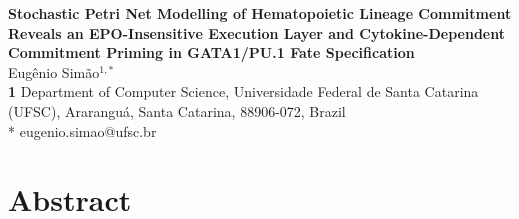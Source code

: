 \documentclass[10pt,letterpaper]{article}
\begin{document}
\vspace*{0.2in}

\begin{flushleft}
{\Large
\textbf{Stochastic Petri Net Modelling of Hematopoietic Lineage Commitment Reveals an EPO-Insensitive Execution Layer and Cytokine-Dependent Commitment Priming in GATA1/PU.1 Fate Specification}
}
\newline
\\
Eug\^enio Sim\~ao$^{1,*}$
\\
\bigskip
\textbf{1} Department of Computer Science, Universidade Federal de Santa Catarina (UFSC), Ararangu\'a, Santa Catarina, 88906-072, Brazil
\\
\bigskip
* eugenio.simao@ufsc.br
\end{flushleft}

\section*{Abstract}
\end{document}
